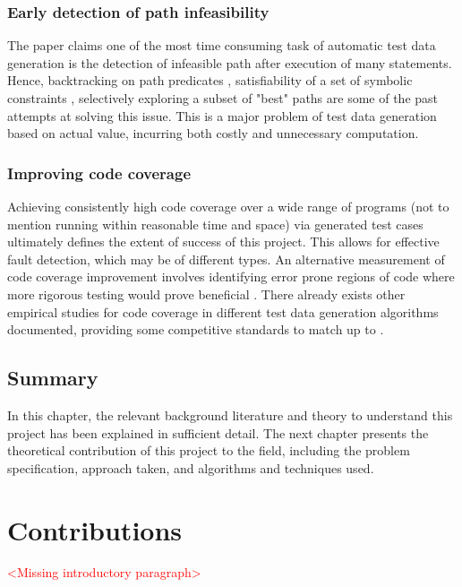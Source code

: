 \documentclass{icldt}
\numberwithin{equation}{section}       %
\begin{document}
\subsection{Early detection of path infeasibility}
The paper \cite{Tahbildar} claims one of the most time consuming task of automatic test data generation is the detection of infeasible path after execution of many statements. Hence, backtracking on path predicates \cite{Korel1990}, satisfiability of a set of symbolic constraints \cite{ZhangW01}, selectively exploring a subset of "best" paths \cite{Prather1987} are some of the past attempts at solving this issue. This is a major problem of test data generation based on actual value, incurring both costly and unnecessary computation.
\subsection{Improving code coverage}
Achieving consistently high code coverage over a wide range of programs (not to mention running within reasonable time and space) via generated test cases ultimately defines the extent of success of this project. This allows for effective fault detection, which may be of different types. An alternative measurement of code coverage improvement involves identifying error prone regions of code where more rigorous testing would prove beneficial \cite{Ntafos1988} \cite{InceDC1987}. There already exists other empirical studies for code coverage in different test data generation algorithms documented, providing some competitive standards to match up to \cite{Han2008} \cite{Rothermel99testcase} \cite{Lakhotia2009}.
\section{Summary}
In this chapter, the relevant background literature and theory to understand this project has been explained in sufficient detail. The next chapter presents the theoretical contribution of this project to the field, including the problem specification, approach taken, and algorithms and techniques used.
\chapter{Contributions}
\label{ch:research}
\textcolor{red}{<Missing introductory paragraph>}
\end{document}
